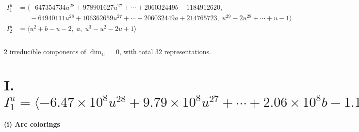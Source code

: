 \documentclass[1p]{elsarticle_modified}
\theoremstyle{definition}
\begin{document}
\begin{align*}
I^u_{1}&=\langle 
-647354734 u^{28}+978901627 u^{27}+\cdots+206032449 b-1184912620,\\
\phantom{I^u_{1}}&\phantom{= \langle  }-64940111 u^{28}+106362659 u^{27}+\cdots+206032449 a+214765723,\;u^{29}-2 u^{28}+\cdots+u-1\rangle \\
I^u_{2}&=\langle 
u^2+b- u-2,\;a,\;u^3- u^2-2 u+1\rangle \\
\\
\end{align*}
\raggedright * 2 irreducible components of $\dim_{\mathbb{C}}=0$, with total 32 representations.\\
\newpage
\renewcommand{\arraystretch}{1}
\centering \section*{I. $I^u_{1}= \langle -6.47\times10^{8} u^{28}+9.79\times10^{8} u^{27}+\cdots+2.06\times10^{8} b-1.18\times10^{9},\;-6.49\times10^{7} u^{28}+1.06\times10^{8} u^{27}+\cdots+2.06\times10^{8} a+2.15\times10^{8},\;u^{29}-2 u^{28}+\cdots+u-1 \rangle$}
\flushleft \textbf{(i) Arc colorings}\\
\end{document}
